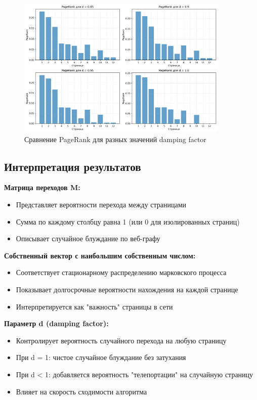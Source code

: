 \begin{figure}[H]
    \centering
    \includegraphics[width=0.9\textwidth]{images/task2/pagerank_comparison.png}
    \caption{Сравнение PageRank для разных значений damping factor}
\end{figure}

\subsection*{Интерпретация результатов}

\textbf{Матрица переходов M:}
\begin{itemize}
    \item Представляет вероятности перехода между страницами
    \item Сумма по каждому столбцу равна 1 (или 0 для изолированных страниц)
    \item Описывает случайное блуждание по веб-графу
\end{itemize}

\textbf{Собственный вектор с наибольшим собственным числом:}
\begin{itemize}
    \item Соответствует стационарному распределению марковского процесса
    \item Показывает долгосрочные вероятности нахождения на каждой странице
    \item Интерпретируется как "важность" страницы в сети
\end{itemize}

\textbf{Параметр d (damping factor):}
\begin{itemize}
    \item Контролирует вероятность случайного перехода на любую страницу
    \item При d = 1: чистое случайное блуждание без затухания
    \item При d < 1: добавляется вероятность "телепортации" на случайную страницу
    \item Влияет на скорость сходимости алгоритма
\end{itemize}

